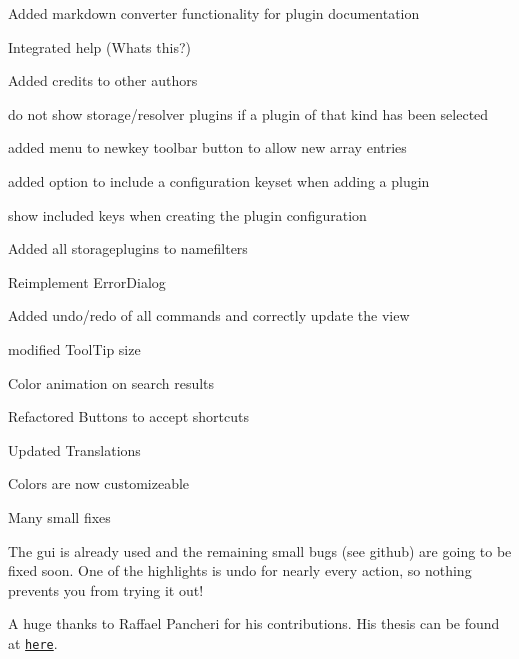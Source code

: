 \begin{DoxyItemize}
\item Added markdown converter functionality for plugin documentation
\item Integrated help (Whats this?)
\item Added credits to other authors
\item do not show storage/resolver plugins if a plugin of that kind has been selected
\item added menu to newkey toolbar button to allow new array entries
\item added option to include a configuration keyset when adding a plugin
\item show included keys when creating the plugin configuration
\item Added all storageplugins to namefilters
\item Reimplement Error\+Dialog
\item Added undo/redo of all commands and correctly update the view
\item modified Tool\+Tip size
\item Color animation on search results
\item Refactored Buttons to accept shortcuts
\item Updated Translations
\item Colors are now customizeable
\item Many small fixes
\end{DoxyItemize}

The gui is already used and the remaining small bugs (see github) are going to be fixed soon. One of the highlights is undo for nearly every action, so nothing prevents you from trying it out!

A huge thanks to Raffael Pancheri for his contributions. His thesis can be found at \href{https://www.libelektra.org/ftp/elektra/pancheri2015gui.pdf}{\tt here}.


